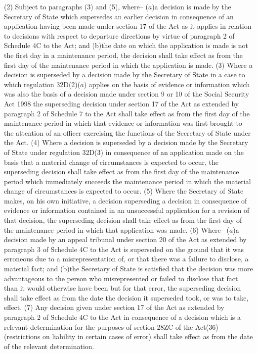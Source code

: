 \documentclass[12pt,a4paper]{article}
\begin{document}
(2) Subject to paragraphs (3) and (5), where–
($a$)a decision is made by the Secretary of State which supersedes an earlier decision in consequence of an application having been made under section 17 of the Act as it applies in relation to decisions with respect to departure directions by virtue of paragraph 2 of Schedule 4C to the Act; and
(b)the date on which the application is made is not the first day in a maintenance period, the decision shall take effect as from the first day of the maintenance period in which the application is made.
(3) Where a decision is superseded by a decision made by the Secretary of State in a case to which regulation 32D(2)($a$) applies on the basis of evidence or information which was also the basis of a decision made under section 9 or 10 of the Social Security Act 1998 the superseding decision under section 17 of the Act as extended by paragraph 2 of Schedule 7 to the Act shall take effect as from the first day of the maintenance period in which that evidence or information was first brought to the attention of an officer exercising the functions of the Secretary of State under the Act.
(4) Where a decision is superseded by a decision made by the Secretary of State under regulation 32D(3) in consequence of an application made on the basis that a material change of circumstances is expected to occur, the superseding decision shall take effect as from the first day of the maintenance period which immediately succeeds the maintenance period in which the material change of circumstances is expected to occur.
(5) Where the Secretary of State makes, on his own initiative, a decision superseding a decision in consequence of evidence or information contained in an unsuccessful application for a revision of that decision, the superseding decision shall take effect as from the first day of the maintenance period in which that application was made.
(6) Where–
($a$)a decision made by an appeal tribunal under section 20 of the Act as extended by paragraph 3 of Schedule 4C to the Act is superseded on the ground that it was erroneous due to a misrepresentation of, or that there was a failure to disclose, a material fact; and
(b)the Secretary of State is satisfied that the decision was more advantageous to the person who misrepresented or failed to disclose that fact than it would otherwise have been but for that error,
the superseding decision shall take effect as from the date the decision it superseded took, or was to take, effect.
(7) Any decision given under section 17 of the Act as extended by paragraph 2 of Schedule 4C to the Act in consequence of a decision which is a relevant determination for the purposes of section 28ZC of the Act(36) (restrictions on liability in certain cases of error) shall take effect as from the date of the relevant determination.
\end{document}
